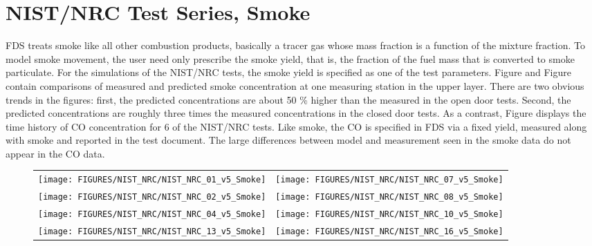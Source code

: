 \clearpage


\section{NIST/NRC Test Series, Smoke}

FDS treats smoke like all other combustion products, basically a tracer gas whose mass fraction is a function of the mixture fraction.
To model smoke movement, the user need only prescribe the smoke yield, that is, the fraction of the fuel mass that is
converted to smoke particulate.  For the simulations of the NIST/NRC tests, the smoke yield is specified as one of the test parameters.
Figure and Figure contain comparisons of measured and predicted smoke concentration at one measuring station in the upper layer.
There are two obvious trends in the figures: first, the predicted concentrations are about 50 \% higher than the measured
in the open door tests.  Second,
the predicted concentrations are roughly three times the measured concentrations in the closed door tests.
As a contrast, Figure displays the time history of CO concentration for 6 of the NIST/NRC tests.
Like smoke, the CO is specified in FDS via a fixed yield, measured along with smoke and reported in the test document.
The large differences between model and measurement seen in the smoke data do not appear in the CO data.

\begin{figure}[p]
\begin{tabular*}{\textwidth}{l@{\extracolsep{\fill}}r}
\texttt{[image: FIGURES/NIST\_NRC/NIST\_NRC\_01\_v5\_Smoke]} &
\texttt{[image: FIGURES/NIST\_NRC/NIST\_NRC\_07\_v5\_Smoke]} \\
\texttt{[image: FIGURES/NIST\_NRC/NIST\_NRC\_02\_v5\_Smoke]} &
\texttt{[image: FIGURES/NIST\_NRC/NIST\_NRC\_08\_v5\_Smoke]} \\
\texttt{[image: FIGURES/NIST\_NRC/NIST\_NRC\_04\_v5\_Smoke]} &
\texttt{[image: FIGURES/NIST\_NRC/NIST\_NRC\_10\_v5\_Smoke]} \\
\texttt{[image: FIGURES/NIST\_NRC/NIST\_NRC\_13\_v5\_Smoke]} &
\texttt{[image: FIGURES/NIST\_NRC/NIST\_NRC\_16\_v5\_Smoke]}
\end{tabular*}
\end{figure}

